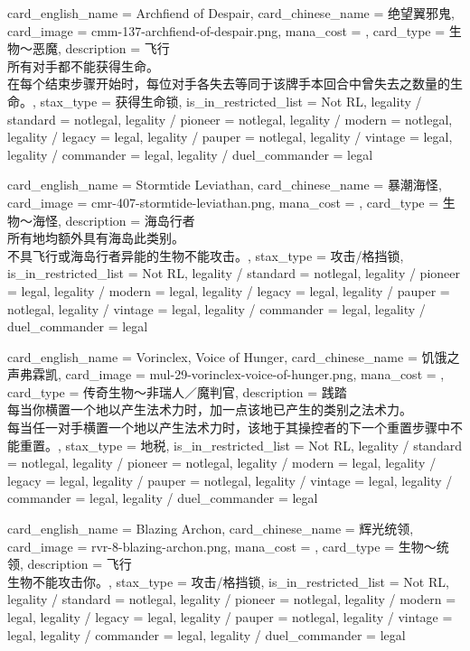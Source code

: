 \documentclass[lang = cn, color = black, 10pt]{AllThatStax}
\begin{document}
\card
{
	card_english_name = {Archfiend of Despair},
	card_chinese_name = {绝望翼邪鬼},
	card_image = cmm-137-archfiend-of-despair.png,
	mana_cost = ,
	card_type = 生物～恶魔,
	description = {飞行\\
所有对手都不能获得生命。\\
在每个结束步骤开始时，每位对手各失去等同于该牌手本回合中曾失去之数量的生命。},
	stax_type = 获得生命锁,
	is_in_restricted_list = Not RL,
	legality / standard = notlegal,
	legality / pioneer = notlegal,
	legality / modern = notlegal,
	legality / legacy = legal,
	legality / pauper = notlegal,
	legality / vintage = legal,
	legality / commander = legal,
	legality / duel_commander = legal
}

\card
{
	card_english_name = {Stormtide Leviathan},
	card_chinese_name = {暴潮海怪},
	card_image = cmr-407-stormtide-leviathan.png,
	mana_cost = ,
	card_type = 生物～海怪,
	description = {海岛行者\\
所有地均额外具有海岛此类别。\\
不具飞行或海岛行者异能的生物不能攻击。},
	stax_type = 攻击/格挡锁,
	is_in_restricted_list = Not RL,
	legality / standard = notlegal,
	legality / pioneer = legal,
	legality / modern = legal,
	legality / legacy = legal,
	legality / pauper = notlegal,
	legality / vintage = legal,
	legality / commander = legal,
	legality / duel_commander = legal
}

\card
{
	card_english_name = {Vorinclex, Voice of Hunger},
	card_chinese_name = {饥饿之声弗霖凯},
	card_image = mul-29-vorinclex-voice-of-hunger.png,
	mana_cost = ,
	card_type = 传奇生物～非瑞人／魔判官,
	description = {践踏\\
每当你横置一个地以产生法术力时，加一点该地已产生的类别之法术力。\\
每当任一对手横置一个地以产生法术力时，该地于其操控者的下一个重置步骤中不能重置。},
	stax_type = 地税,
	is_in_restricted_list = Not RL,
	legality / standard = notlegal,
	legality / pioneer = notlegal,
	legality / modern = legal,
	legality / legacy = legal,
	legality / pauper = notlegal,
	legality / vintage = legal,
	legality / commander = legal,
	legality / duel_commander = legal
}

\card
{
	card_english_name = {Blazing Archon},
	card_chinese_name = {辉光统领},
	card_image = rvr-8-blazing-archon.png,
	mana_cost = ,
	card_type = 生物～统领,
	description = {飞行\\
生物不能攻击你。},
	stax_type = 攻击/格挡锁,
	is_in_restricted_list = Not RL,
	legality / standard = notlegal,
	legality / pioneer = notlegal,
	legality / modern = legal,
	legality / legacy = legal,
	legality / pauper = notlegal,
	legality / vintage = legal,
	legality / commander = legal,
	legality / duel_commander = legal
}
\end{document}
